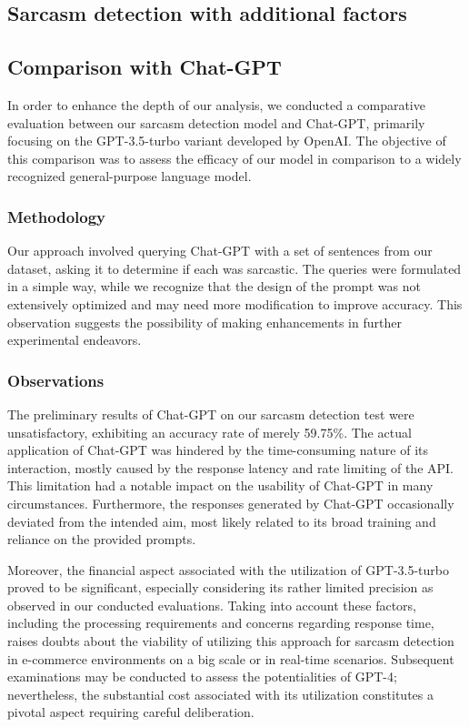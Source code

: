 \documentclass[10pt,twocolumn,letterpaper]{article}
\begin{document}
\subsection{Sarcasm detection with additional factors}

\subsection{Comparison with Chat-GPT}
In order to enhance the depth of our analysis, we conducted a comparative evaluation between our sarcasm detection model and Chat-GPT, primarily focusing on the GPT-3.5-turbo variant developed by OpenAI.
The objective of this comparison was to assess the efficacy of our model in comparison to a widely recognized general-purpose language model.

\subsubsection{Methodology}
Our approach involved querying Chat-GPT with a set of sentences from our dataset, asking it to determine if each was sarcastic.
The queries were formulated in a simple way, while we recognize that the design of the prompt was not extensively optimized and may need more modification to improve accuracy.
This observation suggests the possibility of making enhancements in further experimental endeavors.

\subsubsection{Observations}
The preliminary results of Chat-GPT on our sarcasm detection test were unsatisfactory, exhibiting an accuracy rate of merely 59.75\%.
The actual application of Chat-GPT was hindered by the time-consuming nature of its interaction, mostly caused by the response latency and rate limiting of the API. This limitation had a notable impact on the usability of Chat-GPT in many circumstances.
Furthermore, the responses generated by Chat-GPT occasionally deviated from the intended aim, most likely related to its broad training and reliance on the provided prompts.

Moreover, the financial aspect associated with the utilization of GPT-3.5-turbo proved to be significant, especially considering its rather limited precision as observed in our conducted evaluations.
Taking into account these factors, including the processing requirements and concerns regarding response time, raises doubts about the viability of utilizing this approach for sarcasm detection in e-commerce environments on a big scale or in real-time scenarios.
Subsequent examinations may be conducted to assess the potentialities of GPT-4; nevertheless, the substantial cost associated with its utilization constitutes a pivotal aspect requiring careful deliberation.
\end{document}
